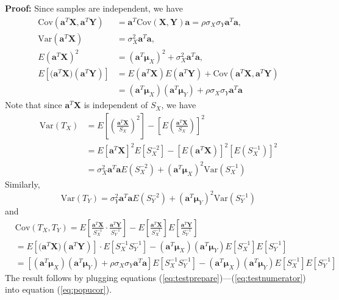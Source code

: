 \documentclass[review]{elsarticle}
\newcommand{\cov}{\text{Cov}}
\newcommand{\var}{\text{Var}}
\begin{document}
	\textbf{Proof:} Since samples are independent, we have 
	\begin{equation}\label{eq:testprepare}
	\begin{aligned}
	\cov(\bm a^T\bm X, \bm a^T\bm Y) &= \bm a^T \cov(\bm X, \bm Y)\bm a  = \rho\sigma_X\sigma_Y\bm 
	a^T\bm a, \\
	\var(\bm a^T\bm X)&  = \sigma_X^2\bm a^T\bm a, \\
	E(\bm a^T\bm X)^2& =(\bm a^T\bm \mu_X)^2 + \sigma_X^2\bm a^T\bm a, \\
	E[\bm (\bm a^T\bm X)(\bm a^T\bm Y)] &=E(\bm a^T\bm X)E(\bm a^T\bm Y) + \cov(\bm a^T\bm X, \bm 
	a^T\bm Y)  	\\& = (\bm a^T\bm \mu_X)(\bm a^T\bm \mu_Y) + \rho \sigma_X\sigma_Y\bm a^T\bm a
	\end{aligned}
	\end{equation}
Note that since $\bm a^T\bm X$ is independent of $S_X$, we have 
\begin{equation}\label{eq:testdenom1}
\begin{aligned}
\var(T_X) &= E\left[\left(\frac{\bm a^T\bm X}{S_X}\right)^2\right] - \left[E\left(\frac{\bm 
	a^T\bm X}{S_X}\right)\right]^2\\
& = E[\bm a^T\bm X]^2E[S_X^{-2}] - \left[E(\bm a^T\bm X)\right]^2\left[E(S_X^{-1})\right]^2\\
& = \sigma_X^2\bm a^T\bm a E(S_X^{-2}) + (\bm a^T\bm \mu_X)^2\var(S_X^{-1})
\end{aligned}
\end{equation}
Similarly, 
\begin{equation}\label{eq:testdenom2}
\var(T_Y)= \sigma_Y^2\bm a^T\bm a E(S_Y^{-2}) + (\bm a^T\bm \mu_Y)^2\var(S_Y^{-1})
\end{equation}
and
\begin{equation}\label{eq:testnumerator}
\begin{aligned}
&\cov(T_X, T_Y) = E\left[\frac{ \bm a^T\bm X }{S_X^{-1}}\cdot\frac{ \bm a^T\bm Y 
}{S_Y^{-1}}\right] - E\left[\frac{\bm a^T\bm X}{S_X^{-1}}\right]E\left[\frac{\bm a^T\bm 
Y}{S_Y^{-1}}\right] \\
& = E[\bm (\bm a^T\bm X)(\bm a^T\bm Y)]\cdot E[S_X^{-1}S_Y^{-1}]-(\bm a^T\bm \mu_X)(\bm a^T\bm 
\mu_Y)E[S_X^{-1}]E[S_Y^{-1}]\\
& = [(\bm a^T\bm \mu_X)(\bm a^T\bm \mu_Y)+ \rho \sigma_X\sigma_Y\bm a^T\bm 
a]E[S_X^{-1}S_Y^{-1}]- (\bm a^T\bm \mu_X)(\bm a^T\bm \mu_Y)E[S_X^{-1}]E[S_Y^{-1}]
\end{aligned}
\end{equation}	
The result follows by plugging equations (\ref{eq:testprepare})---(\ref{eq:testnumerator}) into 
equation (\ref{eq:popucor}).
\end{document}
